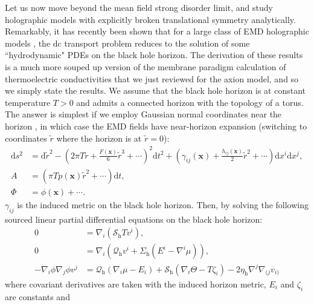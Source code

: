 \documentclass[10pt, oneside]{book}
\begin{document}
\begin{doublespace}
Let us now move beyond the mean field strong disorder limit, and study holographic models with explicitly broken translational symmetry analytically.  Remarkably, it has recently been shown that for a large class of EMD holographic models \cite{Donos:2015gia, Banks:2015wha}, the dc transport problem reduces to the solution of some ``hydrodynamic" PDEs on the black hole horizon.   The derivation of these results is a much more souped up version of the membrane paradigm calculation of thermoelectric conductivities that we just reviewed for the axion model, and so we simply state the results.   We assume that the black hole horizon is at constant temperature $T>0$ and admits a connected horizon with the topology of a torus.  The answer is simplest  if we employ Gaussian normal coordinates near the horizon \cite{Medved:2004tp},  in which case the EMD fields have near-horizon expansion (switching to coordinates $\tilde{r}$ where the horizon is at $\tilde{r}=0$): \begin{subequations}\begin{align}
\mathrm{d}s^2 &= \mathrm{d}\tilde{r}^2 - \left(2\pi T\tilde{r} + \frac{F(\mathbf{x})}{6}\tilde{r}^3 + \cdots\right)^2 \mathrm{d}t^2 + \left(\gamma_{ij}(\mathbf{x}) + \frac{h_{ij}(\mathbf{x})}{2}\tilde{r}^2+\cdots\right)\mathrm{d}x^i\mathrm{d}x^j, \\
A &=  \left(\pi T p(\mathbf{x}) \tilde{r}^2 +\cdots\right) \mathrm{d}t , \\
\Phi &=  \phi(\mathbf{x}) + \cdots.
\end{align}\end{subequations}
$\gamma_{ij}$ is the induced metric on the black hole horizon.   Then, by solving the following sourced linear partial differential equations on the black hole horizon: \begin{subequations}\label{eq:horfluid}\begin{align}
0 &= \nabla_i \left(\mathcal{S}_{\mathrm{h}} T v^i\right), \\
0 &= \nabla_i \left(\mathcal{Q}_{\mathrm{h}}v^i + \Sigma_{\mathrm{h}} \left(E^i - \nabla^i \mu\right)\right), \\
- \nabla_i \phi \nabla_j \phi v^j &= \mathcal{Q}_{\mathrm{h}}(\nabla_i \mu - E_i) + \mathcal{S}_{\mathrm{h}}(\nabla_i \Theta - T\zeta_i) -2\eta_{\mathrm{h}} \nabla^j\nabla_{(j}v_{i)}
\end{align}\end{subequations}where covariant derivatives are taken with the induced horizon metric, $E_i$ and $\zeta_i$ are constants and \begin{subequations}\label{eq:horfluideos}\begin{align}

\end{align}
\end{subequations}
\end{doublespace}
\end{document}
